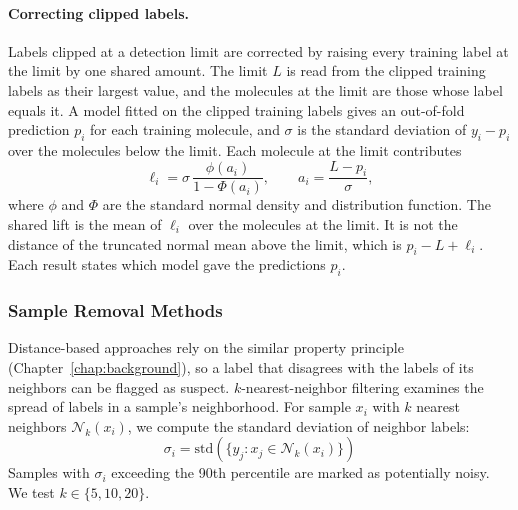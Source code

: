 \paragraph{Correcting clipped labels.}\label{sec:similarity:censoring_lift}
Labels clipped at a detection limit are corrected by raising every training label at the limit by one shared amount. The limit $L$ is read from the clipped training labels as their largest value, and the molecules at the limit are those whose label equals it. A model fitted on the clipped training labels gives an out-of-fold prediction $p_i$ for each training molecule, and $\sigma$ is the standard deviation of $y_i - p_i$ over the molecules below the limit. Each molecule at the limit contributes
\begin{equation}
\ell_i = \sigma\,\frac{\phi(a_i)}{1 - \Phi(a_i)}, \qquad a_i = \frac{L - p_i}{\sigma},
\end{equation}
where $\phi$ and $\Phi$ are the standard normal density and distribution function. The shared lift is the mean of $\ell_i$ over the molecules at the limit. It is not the distance of the truncated normal mean above the limit, which is $p_i - L + \ell_i$. Each result states which model gave the predictions $p_i$.

\subsubsection{Sample Removal Methods}

Distance-based approaches rely on the similar property principle (Chapter~\ref{chap:background}), so a label that disagrees with the labels of its neighbors can be flagged as suspect. $k$-nearest-neighbor filtering examines the spread of labels in a sample's neighborhood. For sample $x_i$ with $k$ nearest neighbors $\mathcal{N}_k(x_i)$, we compute the standard deviation of neighbor labels:
\begin{equation}
\sigma_i = \text{std}(\{y_j : x_j \in \mathcal{N}_k(x_i)\})
\end{equation}
Samples with $\sigma_i$ exceeding the 90th percentile are marked as potentially noisy. We test $k \in \{5, 10, 20\}$.


